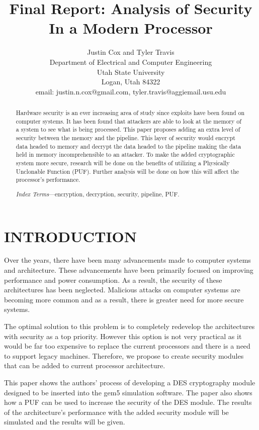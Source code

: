 \documentclass[letterpaper, 10pt, conference]{ieeeconf}  %
\title{\LARGE \bf
Final Report: Analysis of Security In a Modern Processor
}
\author{Justin Cox and Tyler Travis
\\ \small{Department of Electrical and Computer Engineering}
\\ \small{Utah State University}
\\ \small{Logan, Utah 84322}
\\ \small{email: justin.n.cox@gmail.com, tyler.travis@aggiemail.usu.edu}
}
\begin{document}
\maketitle
\thispagestyle{empty}
\pagestyle{empty}


\begin{abstract}

Hardware security is an ever increasing area of study since exploits have been found on computer systems. It has been found that attackers are able to look at the memory of a system to see what is being processed. This paper proposes adding an extra level of security between the memory and the pipeline. This layer of security would encrypt data headed to memory and decrypt the data headed to the pipeline making the data held in memory incomprehensible to an attacker. To make the added cryptographic system more secure, research will be done on the benefits of utilizing a Physically Unclonable Function (PUF). Further analysis will be done on how this will affect the processor's performance.

\emph{Index Terms}---encryption, decryption, security, pipeline, PUF.

\end{abstract}

\section{INTRODUCTION}

Over the years, there have been many advancements made to computer systems and architecture. These advancements have been primarily focused on improving performance and power consumption. As a result, the security of these architectures has been neglected. Malicious attacks on computer systems are becoming more common and as a result, there is greater need for more secure systems.

The optimal solution to this problem is to completely redevelop the architectures with security as a top priority. However this option is not very practical as it would be far too expensive to replace the current processors and there is a need to support legacy machines. Therefore, we propose to create security modules that can be added to current processor architecture.

This paper shows the authors' process of developing a DES cryptography module designed to be inserted into the gem5 simulation software.  The paper also shows how a PUF can be used to increase the security of the DES module.  The results of the architecture's performance with the added security module will be simulated and the results will be given. 
\end{document}
